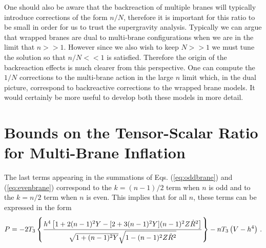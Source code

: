 One should also be aware that the backreaction of multiple branes will
typically introduce corrections of the form $n/N$, therefore it is important
for this ratio to be small in order for us to trust the supergravity analysis.
Typically we can argue that wrapped branes are dual to multi-brane configurations when
we are in the limit that $n>>1$. However since we also wish to keep $N>>1$ we must tune
the solution so that $n/N<<1$ is satisfied. Therefore the origin of the backreaction effects
is much clearer from this perspective. One can compute the $1/N$ corrections to the multi-brane
action in the large $n$ limit \cite{Ward:2007gs} which, in the dual picture, correspond to
backreactive corrections
to the wrapped brane models. It would certainly be more useful to develop both these models in more
detail.


% 
% 
\section{Bounds on the Tensor-Scalar Ratio for Multi-Brane 
Inflation} 
\label{sec:multibounds-multi}


The last terms appearing in the summations of Eqs. (\ref{eq:oddbrane}) 
and (\ref{eq:evenbrane}) correspond  to the $k=(n-1)/2$ 
term when $n$ is odd and to the $k=n/2$ term when $n$ is even. This 
implies that for all $n$, these terms can be expressed in the form 
% 
\begin{equation}
\label{eq:unifiedgenP-multi}
P = -2T_3 \left\{ \frac{h^4 \left[ 1+2(n-1)^2Y
- [ 2+3(n-1)^2Y] (n-1)^2Z\dot{R}^2  \right]}{\sqrt{1+(n-1)^2Y}
\sqrt{1-(n-1)^2Z\dot{R}^2}} 
 \right\} -n T_3 \left( V -h^4 \right) \,.
\end{equation}
% 


